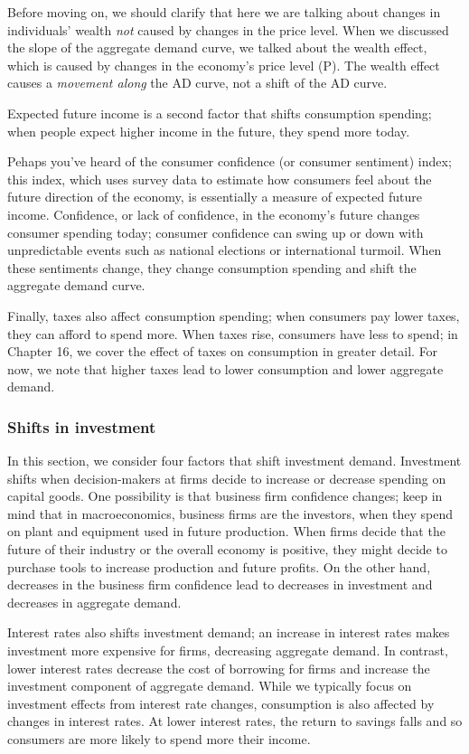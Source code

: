 \documentclass[11pt]{article} %
\begin{document}
Before moving on, we should clarify that here we are talking about changes in individuals' wealth \textit{not} caused by changes in the price level. When we discussed the slope of the aggregate demand curve, we talked about the wealth effect, which is caused by changes in the economy's price level (P). The wealth effect causes a \textit{movement along} the AD curve, not a shift of the AD curve.

Expected future income is a second factor that shifts consumption spending; when people expect higher income in the future, they spend more today.

Pehaps you've heard of the consumer confidence (or consumer sentiment) index; this index, which uses survey data to estimate how consumers feel about the future direction of the economy, is essentially a measure of expected future income. Confidence, or lack of confidence, in the economy's future changes consumer spending today; consumer confidence can swing up or down with unpredictable events such as national elections or international turmoil. When these sentiments change, they change consumption spending and shift the aggregate demand curve.

Finally, taxes also affect consumption spending; when consumers pay lower taxes, they can afford to spend more. When taxes rise, consumers have less to spend; in Chapter 16, we cover the effect of taxes on consumption in greater detail. For now, we note that higher taxes lead to lower consumption and lower aggregate demand.

\subsubsection*{Shifts in investment}
In this section, we consider four factors that shift investment demand. Investment shifts when decision-makers at firms decide to increase or decrease spending on capital goods. One possibility is that business firm confidence changes; keep in mind that in macroeconomics, business firms are the investors, when they spend on plant and equipment used in future production. When firms decide that the future of their industry or the overall economy is positive, they might decide to purchase tools to increase production and future profits. On the other hand, decreases in the business firm confidence lead to decreases in investment and decreases in aggregate demand.

Interest rates also shifts investment demand; an increase in interest rates makes investment more expensive for firms, decreasing aggregate demand. In contrast, lower interest rates decrease the cost of borrowing for firms and increase the investment component of aggregate demand. While we typically focus on investment effects from interest rate changes, consumption is also affected by changes in interest rates. At lower interest rates, the return to savings falls and so consumers are more likely to spend more their income.
\end{document}
